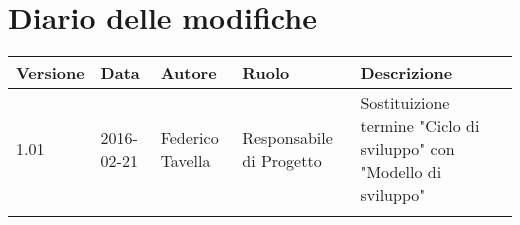 

	\section*{Diario delle modifiche}
	
\begin{longtabu} to \textwidth {V X[c m 0.8cm] X[c m 0.7cm] X[c m 0.8cm] X[cm]}
	\toprule
	\textbf{Versione} & \textbf{Data}  & \textbf{Autore} & \textbf{Ruolo} & \textbf{Descrizione} \\
	\midrule
	\endhead
	1.01 & 2016-02-21 & Federico Tavella & Responsabile di Progetto & Sostituizione termine "Ciclo di sviluppo" con "Modello di sviluppo" \\
	\midrule
	\bottomrule
\end{longtabu}